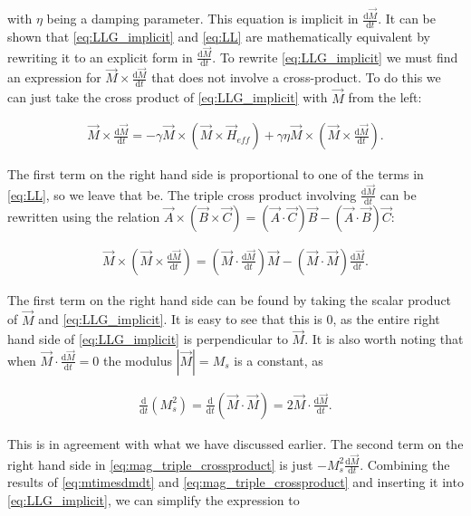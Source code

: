 \documentclass[1p]{elsarticle}		%
\begin{document}
with $\eta$ being a damping parameter. This equation is implicit in $\frac{\textrm{d} \vec{M}}{\textrm{d} t}$. It can be shown that \eqref{eq:LLG_implicit} and \eqref{eq:LL} are mathematically equivalent by rewriting it to an explicit form in $\frac{\textrm{d} \vec{M}}{\textrm{d} t}$. To rewrite \eqref{eq:LLG_implicit} we must find an expression for $\vec{M}\times\frac{\textrm{d} \vec{M}}{\textrm{d} t}$ that does not involve a cross-product. To do this we can just take the cross product of \eqref{eq:LLG_implicit} with $\vec{M}$ from the left:

\begin{align}
\label{eq:mtimesdmdt}
\vec{M}\times\frac{\textrm{d} \vec{M}}{\textrm{d} t} = -\gamma \vec{M}\times(\vec{M}\times\vec{H}_{eff}) + \gamma\eta \vec{M}\times(\vec{M}\times\frac{\textrm{d} \vec{M}}{\textrm{d} t}).
\end{align}

The first term on the right hand side is proportional to one of the terms in \eqref{eq:LL}, so we leave that be. The triple cross product involving $\frac{\textrm{d} \vec{M}}{\textrm{d} t}$ can be rewritten using the relation $\vec{A}\times(\vec{B}\times\vec{C}) = (\vec{A}\cdot\vec{C})\vec{B} - (\vec{A}\cdot\vec{B})\vec{C}$:

\begin{align}
\label{eq:mag_triple_crossproduct}
\vec{M}\times(\vec{M}\times\frac{\textrm{d} \vec{M}}{\textrm{d} t}) =  (\vec{M}\cdot\frac{\textrm{d} \vec{M}}{\textrm{d} t})\vec{M} - (\vec{M}\cdot\vec{M})\frac{\textrm{d} \vec{M}}{\textrm{d} t}.
\end{align}

The first term on the right hand side can be found by taking the scalar product of $\vec{M}$ and \eqref{eq:LLG_implicit}. It is easy to see that this is 0, as the entire right hand side of \eqref{eq:LLG_implicit} is perpendicular to $\vec{M}$. It is also worth noting that when $\vec{M}\cdot \frac{\textrm{d} \vec{M}}{\textrm{d} t} = 0$ the modulus $|\vec{M}| = M_s$ is a constant, as 

\begin{align}
\frac{\textrm{d}}{\textrm{d} t} (M_s^2) = \frac{\textrm{d}}{\textrm{d} t} (\vec{M}\cdot\vec{M}) = 2 \vec{M} \cdot \frac{\textrm{d} \vec{M}}{\textrm{d} t}.
\end{align}

This is in agreement with what we have discussed earlier. The second term on the right hand side in \eqref{eq:mag_triple_crossproduct} is just $-M_s^2 \frac{\textrm{d} \vec{M}}{\textrm{d} t}$. Combining the results of \eqref{eq:mtimesdmdt} and \eqref{eq:mag_triple_crossproduct} and inserting it into \eqref{eq:LLG_implicit}, we can simplify the expression to
\end{document}
